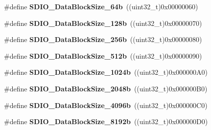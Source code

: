 \begin{DoxyCompactItemize}
\item 
\hypertarget{group___s_d_i_o___data___block___size_ga981c219228ae8df11a501e15843338d4}{\#define {\bfseries S\-D\-I\-O\-\_\-\-Data\-Block\-Size\-\_\-64b}~((uint32\-\_\-t)0x00000060)}\label{group___s_d_i_o___data___block___size_ga981c219228ae8df11a501e15843338d4}

\item 
\hypertarget{group___s_d_i_o___data___block___size_gaba545c3a5e0f3296341d89a647cb9751}{\#define {\bfseries S\-D\-I\-O\-\_\-\-Data\-Block\-Size\-\_\-128b}~((uint32\-\_\-t)0x00000070)}\label{group___s_d_i_o___data___block___size_gaba545c3a5e0f3296341d89a647cb9751}

\item 
\hypertarget{group___s_d_i_o___data___block___size_gaa099d7706f98a4fa6eb88277dc6680cf}{\#define {\bfseries S\-D\-I\-O\-\_\-\-Data\-Block\-Size\-\_\-256b}~((uint32\-\_\-t)0x00000080)}\label{group___s_d_i_o___data___block___size_gaa099d7706f98a4fa6eb88277dc6680cf}

\item 
\hypertarget{group___s_d_i_o___data___block___size_gaa619848f7700962c5b7065f43e286e0b}{\#define {\bfseries S\-D\-I\-O\-\_\-\-Data\-Block\-Size\-\_\-512b}~((uint32\-\_\-t)0x00000090)}\label{group___s_d_i_o___data___block___size_gaa619848f7700962c5b7065f43e286e0b}

\item 
\hypertarget{group___s_d_i_o___data___block___size_ga7dad3c1c33e63a00eb6301b0a1135baf}{\#define {\bfseries S\-D\-I\-O\-\_\-\-Data\-Block\-Size\-\_\-1024b}~((uint32\-\_\-t)0x000000\-A0)}\label{group___s_d_i_o___data___block___size_ga7dad3c1c33e63a00eb6301b0a1135baf}

\item 
\hypertarget{group___s_d_i_o___data___block___size_ga41eb937621c7ffcf2688c6bc0ea31464}{\#define {\bfseries S\-D\-I\-O\-\_\-\-Data\-Block\-Size\-\_\-2048b}~((uint32\-\_\-t)0x000000\-B0)}\label{group___s_d_i_o___data___block___size_ga41eb937621c7ffcf2688c6bc0ea31464}

\item 
\hypertarget{group___s_d_i_o___data___block___size_ga360411488abdbaf9eee9b99fca793f79}{\#define {\bfseries S\-D\-I\-O\-\_\-\-Data\-Block\-Size\-\_\-4096b}~((uint32\-\_\-t)0x000000\-C0)}\label{group___s_d_i_o___data___block___size_ga360411488abdbaf9eee9b99fca793f79}

\item 
\hypertarget{group___s_d_i_o___data___block___size_gaf61913f3eff52c0f728db9ffbdaca7d2}{\#define {\bfseries S\-D\-I\-O\-\_\-\-Data\-Block\-Size\-\_\-8192b}~((uint32\-\_\-t)0x000000\-D0)}\label{group___s_d_i_o___data___block___size_gaf61913f3eff52c0f728db9ffbdaca7d2}


\end{DoxyCompactItemize}
